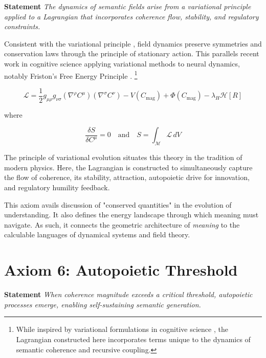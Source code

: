\textbf{Statement} \textit{The dynamics of semantic fields arise from a variational principle applied to a Lagrangian that incorporates coherence flow, stability, and regulatory constraints.}

Consistent with the variational principle \autocite{GoldsteinPooleSafko2002, Arnold1989}, field dynamics preserve symmetries and conservation laws through the principle of stationary action. This parallels recent work in cognitive science applying variational methods to neural dynamics, notably Friston's Free Energy Principle \autocite{Friston2010, Parr2022}. \footnote{While inspired by variational formulations in cognitive science \autocite{Friston2010, Parr2022}, the Lagrangian constructed here incorporates terms unique to the dynamics of semantic coherence and recursive coupling.}

\begin{equation}
\mathcal{L} = \frac{1}{2} g_{\mu\rho} g_{\nu\sigma} (\nabla^\rho C^\mu)(\nabla^\sigma C^\nu) - V(C_{\text{mag}}) + \Phi(C_{\text{mag}}) - \lambda_H \mathcal{H}[R]
\end{equation}

where

\begin{equation}
\frac{\delta S}{\delta C^\mu} = 0 \quad \text{and} \quad S = \int_{\mathcal{M}} \mathcal{L} \, dV
\end{equation}

The principle of variational evolution situates this theory in the tradition of modern physics. Here, the Lagrangian is constructed to simultaneously capture the flow of coherence, its stability, attraction, autopoietic drive for innovation, and regulatory humility feedback.

This axiom avails discussion of "conserved quantities" in the evolution of understanding. It also defines the energy landscape through which meaning must navigate. As such, it connects the geometric architecture of \textit{meaning} to the calculable languages of dynamical systems and field theory.


\section{Axiom 6: Autopoietic Threshold}
\label{1.6:axiom_6_autopoietic_threshold}

\textbf{Statement} \textit{When coherence magnitude exceeds a critical threshold, autopoietic processes emerge, enabling self-sustaining semantic generation.}

